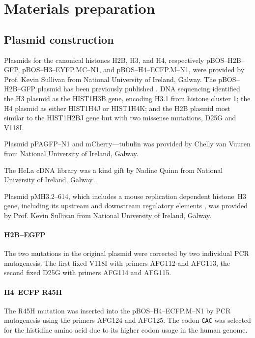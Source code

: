 \section{Materials preparation}

  \subsection{Plasmid construction}

    Plasmids for the canonical histones H2B, H3, and H4,
    respectively pBOS--H2B--GFP, pBOS--H3--EYFP.MC--N1, and pBOS--H4--ECFP.M--N1,
    were provided by Prof. Kevin Sullivan from National University of Ireland,
    Galway. The pBOS--H2B--GFP plasmid has been previously published
    \citep{KevinH2BGFP}. DNA sequencing identified the H3 plasmid as
    the HIST1H3B gene, encoding H3.1 from histone cluster 1; the H4 plasmid
    as either HIST1H4J or HIST1H4K; and the H2B plasmid most similar to the
    HIST1H2BJ gene but with two missense mutations, D25G and V118I.

    Plasmid pPAGFP--N1 and mCherry--\textalpha--tubulin was provided by
    Chelly van Vuuren from National University of Ireland, Galway.

    The HeLa cDNA library was a kind gift by Nadine Quinn from National University
    of Ireland, Galway \citep{NadineThesis}.

    Plasmid pMH3.2--614, which includes a mouse replication dependent histone~H3
    gene, including its upstream and downstream regulatory elements \citep{pMH3-plasmid},
    was provided by Prof. Kevin Sullivan from National University of Ireland, Galway.

    \paragraph{H2B--EGFP}
      The two mutations in the original plasmid were corrected by two
      individual PCR mutagenesis. The first fixed V118I with primers
      AFG112 and AFG113, the second fixed D25G with primers AFG114 and
      AFG115.

    \paragraph{H4--ECFP R45H}
      The R45H mutation was inserted into the pBOS--H4--ECFP.M--N1 by
      PCR mutagenesis using the primers AFG124 and AFG125. The codon
      \texttt{CAC} was selected for the histidine amino acid due to its
      higher codon usage in the human genome\citep{codon_usage}.

